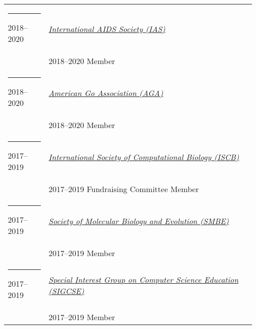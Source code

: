 \documentclass[margin,line]{res}
\begin{document}
\begin{resume}
\begin{longtable}{@{}p{0.7in}p{4in}}
\hspace*{-4mm} \rule{-1mm}{5mm} 2018--2020 & \href{https://www.iasociety.org/}{\textit{International AIDS Society (IAS)}}\\*
\hspace*{-4mm} & \hspace{4mm} 2018--2020 Member\\
\hspace*{-4mm} \rule{-1mm}{5mm} 2018--2020 & \href{http://www.usgo.org/}{\textit{American Go Association (AGA)}}\\*
\hspace*{-4mm} & \hspace{4mm} 2018--2020 Member\\
\hspace*{-4mm} \rule{-1mm}{5mm} 2017--2019 & \href{https://www.iscb.org/}{\textit{International Society of Computational Biology (ISCB)}}\\*
\hspace*{-4mm} & \hspace{4mm} 2017--2019 Fundraising Committee Member\\
\hspace*{-4mm} \rule{-1mm}{5mm} 2017--2019 & \href{http://www.smbe.org/}{\textit{Society of Molecular Biology and Evolution (SMBE)}}\\*
\hspace*{-4mm} & \hspace{4mm} 2017--2019 Member\\
\hspace*{-4mm} \rule{-1mm}{5mm} 2017--2019 & \href{https://sigcse.org/}{\textit{Special Interest Group on Computer Science Education (SIGCSE)}}\\*
\hspace*{-4mm} & \hspace{4mm} 2017--2019 Member\\
\end{longtable}


\end{resume}
\end{document}
